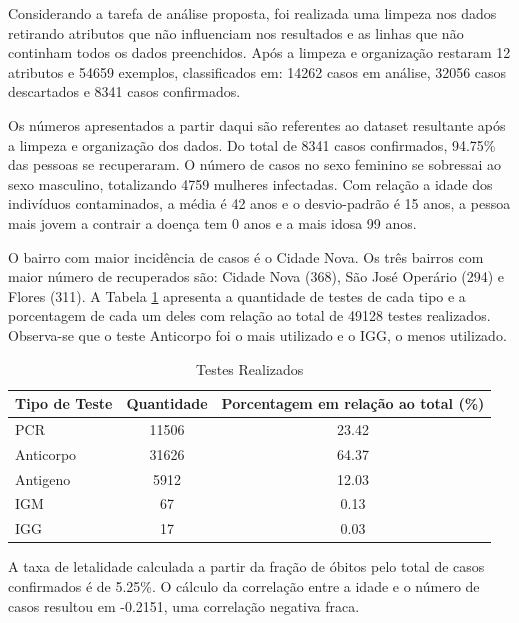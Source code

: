 \documentclass[12pt]{article}
\begin{document}

Considerando a tarefa de análise proposta, foi realizada uma limpeza nos dados retirando atributos que não influenciam nos resultados e as linhas que não continham todos os dados preenchidos. Após a limpeza e organização restaram 12 atributos e 54659 exemplos, classificados em: 14262 casos em análise, 32056 casos descartados e 8341 casos confirmados.


Os números apresentados a partir daqui são referentes ao dataset resultante após a limpeza e organização dos dados. Do total de 8341 casos confirmados, 94.75\% das pessoas se recuperaram. O número de casos no sexo feminino se sobressai ao sexo masculino, totalizando 4759 mulheres infectadas. Com relação a idade dos indivíduos contaminados, a média é 42 anos e o desvio-padrão é 15 anos, a pessoa mais jovem a contrair a doença tem 0 anos e a mais idosa 99 anos.


O bairro com maior incidência de casos é o Cidade Nova. Os três bairros com maior número de recuperados são: Cidade Nova (368), São José Operário (294) e Flores (311). A Tabela \ref{tab1} apresenta a quantidade de testes de cada tipo e a porcentagem de cada um deles com relação ao total de 49128 testes realizados. Observa-se que o teste Anticorpo foi o mais utilizado e o IGG, o menos utilizado.

\begin{table}[h]\footnotesize
	\centering
	\caption{Testes Realizados}
	\begin{tabular}{|l|c|c|}
		\hline
	\textbf{Tipo de Teste}	& \textbf{Quantidade}  & \textbf{Porcentagem em relação ao total (\%)}  \\ \hline
	PCR	& 11506 & 23.42\\ \hline
	Anticorpo	& 31626  & 64.37 \\ \hline
	Antigeno	& 5912 & 12.03  \\ \hline
	IGM	& 67 & 0.13 \\ \hline
	IGG	& 17 & 0.03 \\ \hline
	\end{tabular}
	\label{tab1}
\end{table}

A taxa de letalidade calculada a partir da fração de óbitos pelo total de casos confirmados é de 5.25\%. O cálculo da correlação entre a idade e o número de casos resultou em -0.2151, uma correlação negativa fraca.
\end{document}
